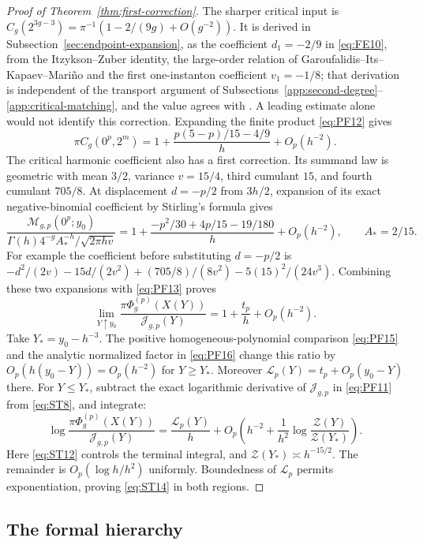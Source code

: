 \begin{proof}[Proof of Theorem~\ref{thm:first-correction}]
The sharper critical input is
$C_g(2^{3g-3})=\pi^{-1}(1-2/(9g)+O(g^{-2}))$.
It is derived in Subsection~\ref{sec:endpoint-expansion}, as the
coefficient $d_1=-2/9$ in \eqref{eq:FE10}, from the Itzykson--Zuber
identity, the large-order relation of Garoufalidis--Its--Kapaev--Mari\~no
and the first one-instanton coefficient $v_1=-1/8$; that derivation is
independent of the transport argument of
Subsections~\ref{app:second-degree}--\ref{app:critical-matching}, and the value
agrees with \cite[equation~(25)]{GYZ}. A leading estimate alone would not identify
this correction. Expanding the finite product \eqref{eq:PF12} gives
\[
 \pi C_g(0^p,2^m)=
 1+\frac{p(5-p)/15-4/9}{h}+O_p(h^{-2}).
\]
The critical harmonic coefficient also has a first correction. Its
summand law is geometric with mean $3/2$, variance $v=15/4$,
third cumulant $15$, and fourth cumulant $705/8$. At displacement
$d=-p/2$ from $3h/2$, expansion of its exact negative-binomial
coefficient by Stirling's formula gives
\[
 \frac{\mathcal M_{g,p}(0^p;y_0)}
 {\Gamma(h)4^{-g}A_*^{-h}/\sqrt{2\pi hv}}
 =1+\frac{-p^2/30+4p/15-19/180}{h}+O_p(h^{-2}),
 \qquad A_*=2/15.
\]
For example the coefficient before substituting $d=-p/2$ is
$-d^2/(2v)-15d/(2v^2)+(705/8)/(8v^2)-5(15)^2/(24v^3)$.
Combining these two expansions with \eqref{eq:PF13} proves
\[
 \lim_{Y\uparrow y_0}
 \frac{\pi\Phi_g^{(p)}(X(Y))}{\mathcal J_{g,p}(Y)}
 =1+\frac{t_p}{h}+O_p(h^{-2}).
\]
Take $Y_*=y_0-h^{-3}$. The positive homogeneous-polynomial comparison
\eqref{eq:PF15} and the analytic normalized factor in \eqref{eq:PF16}
change this ratio by $O_p(h(y_0-Y))=O_p(h^{-2})$ for $Y\ge Y_*$.
Moreover $\mathcal L_p(Y)=t_p+O_p(y_0-Y)$ there.
For $Y\le Y_*$, subtract the exact logarithmic derivative of
$\mathcal J_{g,p}$ in \eqref{eq:PF11} from \eqref{eq:ST8}, and integrate:
\[
 \log\frac{\pi\Phi_g^{(p)}(X(Y))}{\mathcal J_{g,p}(Y)}
 =\frac{\mathcal L_p(Y)}h+
 O_p\!\left(h^{-2}+\frac1{h^2}
             \log\frac{\mathcal Z(Y)}{\mathcal Z(Y_*)}\right).
\]
Here \eqref{eq:ST12} controls the terminal integral, and
$\mathcal Z(Y_*)\asymp h^{-15/2}$. The remainder is
$O_p(\log h/h^2)$ uniformly. Boundedness of $\mathcal L_p$ permits
exponentiation, proving \eqref{eq:ST14} in both regions.
\end{proof}

\subsection{The formal hierarchy}\label{sec:full-expansion}

